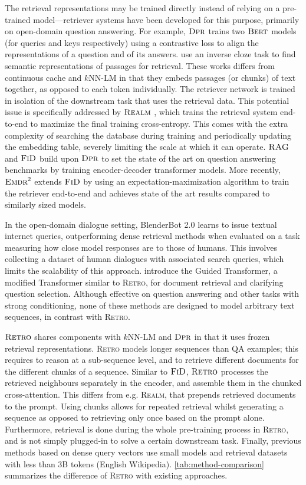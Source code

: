 \documentclass[11pt, a4paper, logo]{deepmind}
\newcommand{\bert}{\textsc{Bert}\xspace}
\newcommand{\knnlm}{k\textrm{NN-LM}}
\newcommand{\dpr}{\textsc{Dpr}}
\newcommand{\rag}{\textsc{RAG}}
\newcommand{\realm}{\textsc{Realm}}
\newcommand{\fid}{\textsc{FiD}}
\newcommand{\emdr}{\textsc{Emdr}^2}
\newcommand{\retro}{\textsc{Retro}\xspace}
\begin{document}
The retrieval representations may be trained directly instead of relying on a pre-trained model---retriever systems have been developed for this purpose, primarily on open-domain question answering. 
For example, $\dpr$ \citep{karpukhin2020dense} trains two $\bert$ models (for queries and keys respectively) using a contrastive loss to align the representations of a question and of its answers. \cite{lee_latent_2019} use an inverse cloze task to find semantic representations of passages for retrieval.
These works differs from continuous cache and $\knnlm$ in that they embeds passages (or chunks) of text together, as opposed to each token individually. The retriever network is trained in isolation of the downstream task that uses the retrieval data. This potential issue is specifically addressed by $\realm$ \citep{guu2020retrieval}, which trains the retrieval system end-to-end to maximize the final training cross-entropy.
This comes with the extra complexity of searching the database during training and periodically updating the embedding table, severely limiting the scale at which it can operate.
$\rag$ \citep{lewis2020retrieval} and $\fid$ \citep{izacard2020leveraging} build upon $\dpr$ to set the state of the art on question answering benchmarks by training encoder-decoder transformer models.
More recently, $\emdr$ \citep{emdr} extends $\fid$ by using an expectation-maximization algorithm to train the retriever end-to-end and achieves state of the art results compared to similarly sized models.

In the open-domain dialogue setting, BlenderBot 2.0 \citep{komeili2021internet} learns to issue textual internet queries, outperforming dense retrieval methods when evaluated on a task measuring how close model responses are to those of humans. This involves collecting a dataset of human dialogues with associated search queries, which limits the scalability of this approach.
\citet{hashemi2020guided} introduce the Guided Transformer, a modified Transformer similar to \retro, for document retrieval and clarifying question selection.
Although effective on question answering and other tasks with strong conditioning, none of these methods are designed to model arbitrary text sequences, in contrast with \retro.

$\retro$ shares components with $\knnlm$ and $\dpr$ in that it uses frozen retrieval representations.
\retro models longer sequences than QA examples; this requires to reason at a sub-sequence level, and to retrieve different documents for the different chunks of a sequence.
Similar to $\fid$, $\retro$ processes the retrieved neighbours separately in the encoder, and assemble them in the chunked cross-attention.
This differs from e.g. \realm, that prepends retrieved documents to the prompt.
Using chunks allows for repeated retrieval whilst generating a sequence as opposed to retrieving only once based on the prompt alone.
Furthermore, retrieval is done during the whole pre-training process in \retro, and is not simply plugged-in to solve a certain downstream task.
Finally, previous methods based on dense query vectors use small models and retrieval datasets with less than 3B tokens (English Wikipedia). \autoref{tab:method-comparison} summarizes the difference of \retro with existing approaches.
\end{document}
